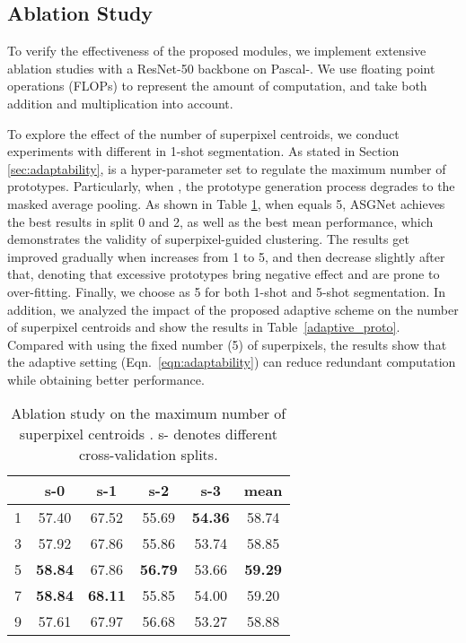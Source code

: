 \subsection{Ablation Study}
To verify the effectiveness of the proposed modules, we implement extensive ablation studies with a 
ResNet-50 backbone on Pascal-.
We use floating point operations (FLOPs) to represent the amount of computation, and take both addition and multiplication into account.

\label{max_proto}
\vspace{1mm}
To explore the effect of the number of superpixel centroids, we conduct experiments with different  in 1-shot segmentation.
As stated in Section \ref{sec:adaptability},  is a hyper-parameter set to regulate the maximum number of prototypes.
Particularly, when , the prototype generation process degrades to the masked average pooling.
As shown in Table \ref{proto_number}, when  equals 5, ASGNet achieves the best results in split 0 and 2, as well as the best mean performance, which 
demonstrates the validity of superpixel-guided clustering.
The results get improved gradually when  increases from 1 to 5, and then decrease slightly after that, denoting that excessive prototypes bring negative effect and are prone to over-fitting.
Finally, we choose  as 5 for both 1-shot and 5-shot segmentation.
In addition, we analyzed
the impact of the proposed adaptive scheme on the number of superpixel centroids  and show the results in Table~\ref{adaptive_proto}.
Compared with using the fixed number (5) of superpixels, the results show that the adaptive setting (Eqn.~\ref{eqn:adaptability}) can reduce redundant computation while obtaining 
better performance.





\begin{table}[htbp]
\begin{center}
\begin{tabular}{|c|cccc|c|}
\hline
 & s-0 & s-1 & s-2 & s-3 & mean\\ \hline \hline
1        &  57.40       & 67.52       &  55.69     & \textbf{54.36}    & 58.74 \\
3        &  57.92       & 67.86       &  55.86     & 53.74    & 58.85 \\
5        &  \textbf{58.84}       & 67.86       &  \textbf{56.79}     & 53.66    & \textbf{59.29} \\ 
7        &  \textbf{58.84}       & \textbf{68.11}       &  55.85     & 54.00    & 59.20 \\ 
9        &  57.61       & 67.97       &  56.68     & 53.27    & 58.88 \\ \hline
\end{tabular}
\end{center}
\caption{Ablation study on the maximum number of superpixel centroids . s- denotes different cross-validation splits.}
\label{proto_number}
\end{table}

